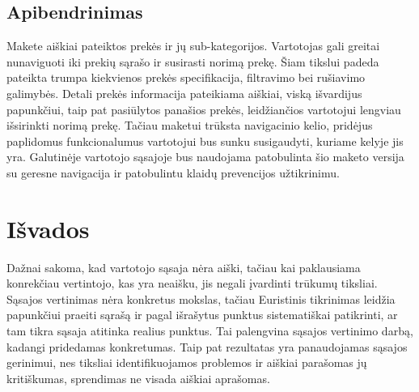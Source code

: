 \documentclass[oneside]{VUMIFPSkursinis}
\begin{document}
\begin{center}
\begin{tabular}{ |p{4cm}| p{6cm} | p{7cm} | }
	
	
	
   \hline
    \end{tabular}
\end{center}

\pagebreak
	\subsection{Apibendrinimas}
Makete aiškiai pateiktos prekės ir jų sub-kategorijos. Vartotojas gali greitai nunaviguoti iki prekių sąrašo ir susirasti norimą prekę. Šiam tikslui padeda pateikta trumpa kiekvienos prekės specifikacija, filtravimo bei rušiavimo galimybės. Detali prekės informacija pateikiama aiškiai, viską išvardijus papunkčiui, taip pat pasiūlytos panašios prekės, leidžiančios vartotojui lengviau išsirinkti norimą prekę. Tačiau maketui trūksta navigacinio kelio, pridėjus paplidomus funkcionalumus vartotojui bus sunku susigaudyti, kuriame kelyje jis yra. Galutinėje vartotojo sąsajoje bus naudojama patobulinta šio maketo versija su geresne navigacija ir patobulintu klaidų prevencijos užtikrinimu.

\iffalse XXXXXXXXXXXXXXXXXXXXXXXXXXXXXXXXXXXXXXXXXXXXXXXXXXXXXXXXXXXXXXXXXXXXXXXXXXXXXXXXXXXXXXXXXXXXXXXXXXXXXXXXXXXXXXXXXXXXXXXXXXXXXXXXXXXXXXX \fi
\section{Išvados}
Dažnai sakoma, kad vartotojo sąsaja nėra aiški, tačiau kai paklausiama konrekčiau vertintojo, kas yra neaišku, jis negali įvardinti trūkumų tiksliai.
Sąsajos vertinimas nėra konkretus mokslas, tačiau Euristinis tikrinimas leidžia papunkčiui praeiti sąrašą ir pagal išrašytus punktus sistematiškai patikrinti, ar tam tikra sąsaja atitinka realius punktus.
Tai palengvina sąsajos vertinimo darbą, kadangi pridedamas konkretumas.
Taip pat rezultatas yra panaudojamas sąsajos gerinimui, nes tiksliai identifikuojamos problemos ir aiškiai parašomas jų kritiškumas, sprendimas ne visada aiškiai aprašomas.
\end{document}

